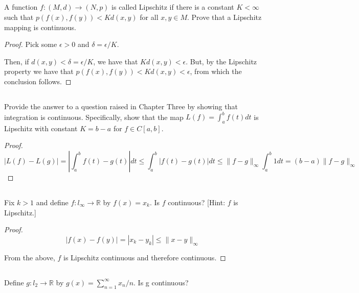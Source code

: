 \subsection{} A function  $f: (M, d) \rightarrow (N, p)$ is called Lipschitz if there is a  constant $K < \infty$ such that $p(f(x), f(y)) < Kd(x, y)$ for all $x, y \in M$. Prove that a Lipschitz mapping is continuous.

\begin{proof}
Pick some $\epsilon > 0$ and $\delta = \epsilon/K$.

Then, if $d(x,y) < \delta = \epsilon / K$, we have that $Kd(x,y) < \epsilon$. But, by the Lipschitz property we have that $p(f(x), f(y)) < Kd(x, y) < \epsilon$, from which the conclusion follows.
\end{proof}


\subsection{} Provide the answer to a question raised in Chapter Three by showing that integration is continuous. Specifically, show that the map $L(f) = \int_a^b f(t) dt $ is Lipschitz with constant $K = b-a$ for $f \in C[a, b]$.

\begin{proof}

$$|L(f) - L(g)| = | \int_a^b f(t) - g(t) | dt \leq \int_a^b |f(t) - g(t)| dt \leq \|f-g\|_\infty \int_a^b 1 dt = (b-a)\|f-g\|_\infty$$

\end{proof}

\subsection{} Fix $k > 1$ and define $f: l_\infty \rightarrow \mathbb{R}$ by $f(x) = x_k$. Is $f$ continuous? [Hint: $f$ is Lipschitz.] 

\begin{proof}
$$|f(x) - f(y)| = |x_k - y_k| \leq \|x - y\|_\infty$$

From the above, $f$ is Lipschitz continuous and therefore continuous.
\end{proof}

\subsection{} Define $g: l_2 \rightarrow \mathbb{R}$ by $g(x) = \sum_{n=1}^\infty x_n/n$. Is g continuous?

